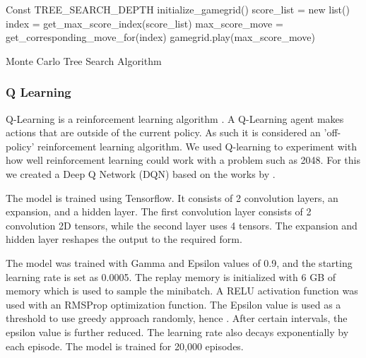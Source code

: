 \documentclass{svproc}
\begin{document}
    \begin{algorithm}[H]
        \SetAlgoLined
        Const TREE\_SEARCH\_DEPTH\;
        initialize\_gamegrid()\;
         {
            score\_list = new list()\;
            index =  get\_max\_score\_index(score\_list)\;
            max\_score\_move = get\_corresponding\_move\_for(index)\;
            gamegrid.play(max\_score\_move)\;
        }
        \caption{Monte Carlo Tree Search Algorithm}
    \end{algorithm}


    \subsubsection{Q Learning}
   	Q-Learning is a reinforcement learning algorithm \cite{watkins1992q}. A Q-Learning agent makes actions that are outside of the current policy. As such it is considered an 'off-policy' reinforcement learning algorithm. We used Q-learning to experiment with how well reinforcement learning could work with a problem such as 2048. For this we created a Deep Q Network (DQN) based on the works by \cite{dqnGit}. 
    	
    	The model is trained using Tensorflow. It consists of 2 convolution layers, an expansion, and a hidden layer. The first convolution layer consists of 2 convolution 2D tensors, while the second layer uses 4 tensors. The expansion and hidden layer reshapes the output to the required form. 
				
		The model was trained with Gamma and Epsilon values of 0.9, and the starting learning rate is set as 0.0005. The replay memory is initialized with 6 GB of memory which is used to sample the minibatch. A RELU activation function was used with an RMSProp optimization function. The Epsilon value is used as a threshold to use greedy approach randomly, hence . After certain intervals, the epsilon value is further reduced. The learning rate also decays exponentially by each episode. The model is trained for 20,000 episodes.
		
\end{document}
